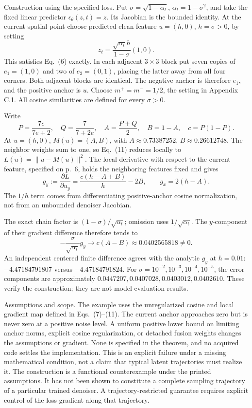 \documentclass[10pt]{article}
\begin{document}
Construction using the specified loss. Put \(\sigma=\sqrt{1-\alpha_t}\), \(\alpha_t=1-\sigma^2\), and take the fixed linear predictor \(\epsilon_\theta(z,t)=z\). Its Jacobian is the bounded identity. At the current spatial point choose predicted clean feature \(u=(h,0)\), \(h=\sigma>0\), by setting \[z_t=\frac{\sqrt{\alpha_t}h}{1-\sigma}(1,0).\] This satisfies Eq. (6) exactly. In each adjacent \(3\times3\) block put seven copies of \(e_1=(1,0)\) and two of \(e_2=(0,1)\), placing the latter away from all four corners. Both adjacent blocks are identical. The negative anchor is therefore \(e_1\), and the positive anchor is \(u\). Choose \(m^+=m^-=1/2\), the setting in Appendix C.1. All cosine similarities are defined for every \(\sigma>0\).\par
Write \[P=\frac{7e}{7e+2},\quad Q=\frac7{7+2e},\quad
 A=\frac{P+Q}{2},\quad B=1-A,\quad c=P(1-P).\] At \(u=(h,0)\), \(M(u)=(A,B)\), with \(A\approx0.73387252\), \(B\approx0.26612748\). The neighbor weights sum to one, so Eq. (11) reduces locally to \(L(u)=\|u-M(u)\|^2\). The local derivative with respect to the current feature, specified on p. 6, holds the neighboring features fixed and gives \[g_y:=\frac{\partial L}{\partial u_y}
   =\frac{c(h-A+B)}h-2B,\qquad g_x=2(h-A).\] The \(1/h\) term comes from differentiating positive-anchor cosine normalization, not from an unbounded denoiser Jacobian.\par
The exact chain factor is \((1-\sigma)/\sqrt{\alpha_t}\); omission uses \(1/\sqrt{\alpha_t}\). The \(y\)-component of their gradient difference therefore tends to \[-\frac{\sigma}{\sqrt{\alpha_t}}g_y
 \longrightarrow c(A-B)
 \approx0.0402565818\neq0.\] An independent centered finite difference agrees with the analytic \(g_y\) at \(h=0.01\): \(-4.47184791807\) versus \(-4.47184791824\). For \(\sigma=10^{-2},10^{-3},10^{-4},10^{-5}\), the error components are approximately \(0.0447207,0.0407028,0.0403012,0.0402610\). These verify the construction; they are not model evaluation results.\par
Assumptions and scope. The example uses the unregularized cosine and local gradient map defined in Eqs. (7)–(11). The current anchor approaches zero but is never zero at a positive noise level. A uniform positive lower bound on limiting anchor norms, explicit cosine regularization, or detached fusion weights changes the assumptions or gradient. None is specified in the theorem, and no acquired code settles the implementation. This is an explicit failure under a missing mathematical condition, not a claim that typical latent trajectories must realize it. The construction is a functional counterexample under the printed assumptions. It has not been shown to constitute a complete sampling trajectory of a particular trained denoiser. A trajectory-restricted guarantee requires explicit control of the loss gradient along that trajectory.\par
\end{document}
